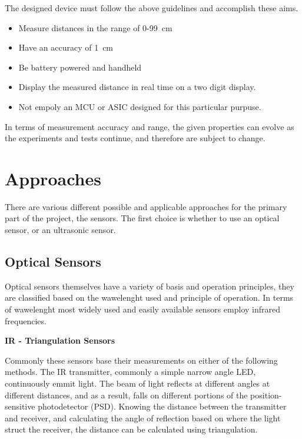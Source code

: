 \documentclass[12pt, a4paper]{article}
\begin{document}
            \noindent The designed device must follow the above guidelines and accomplish these aims. 
            \begin{itemize}
                \item Measure distances in the range of 0-99\SI{}{\centi\metre}
                \item Have an accuracy of \SI{1}{\centi\metre}
                \item Be battery powered and handheld
                \item Display the measured distance in real time on a two digit display.
                \item Not empoly an MCU or ASIC designed for this particular purpuse.
            \end{itemize}

            \noindent In terms of measurement accuracy and range, the given properties can evolve as the experiments and tests continue, and therefore are subject to change. 

        
    \pagebreak
    \section{Approaches}
        There are various different possible and applicable approaches for the primary part of the project, the sensors. The first choice is whether to use an optical sensor, or an ultrasonic sensor.

        \subsection{Optical Sensors}
            Optical sensors themselves have a variety of basis and operation principles, they are classified based on the wawelenght used and principle of operation. In terms of wawelenght most widely used and easily available sensors employ infrared frequencies. 


            \bigskip\noindent
            \textbf{IR - Triangulation Sensors}

                Commonly these sensors base their measurements on either of the following methods. The IR transmitter, commonly a simple narrow angle LED, continuously emmit light. The beam of light reflects at different angles at different distances, and as a result, falls on different portions of the position-sensitive photodetector (PSD). Knowing the distance between the transmitter and receiver, and calculating the angle of reflection based on where the light struct the receiver, the distance can be calculated using triangulation.
\end{document}

